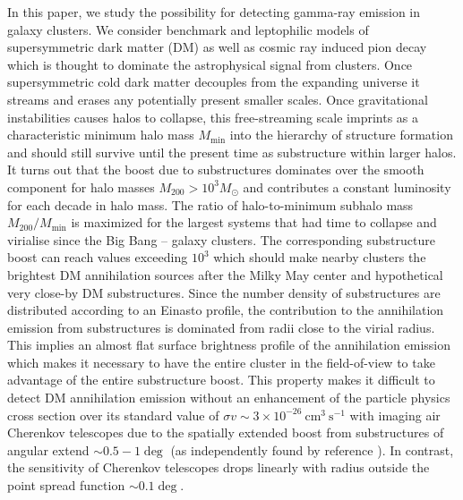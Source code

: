 \documentclass[10pt,aps,pra,reprint,amsmath,amsfonts,amssymb,showpacs,nofootinbib,floatfix]{revtex4-1}
\newcommand{\msun}{M_\odot}
\newcommand{\mvir}{M_{200}}
\begin{document}
In this paper, we study the possibility for detecting gamma-ray
emission in galaxy clusters. We consider benchmark and leptophilic
models of supersymmetric dark matter (DM) as well as cosmic ray
induced pion decay which is thought to dominate the astrophysical
signal from clusters. Once supersymmetric cold dark matter decouples
from the expanding universe it streams and erases any potentially
present smaller scales. Once gravitational instabilities causes halos
to collapse, this free-streaming scale imprints as a characteristic
minimum halo mass $M_\mathrm{min}$ into the hierarchy of structure
formation and should still survive until the present time as
substructure within larger halos. It turns out that the boost due to
substructures dominates over the smooth component for halo masses
$\mvir>10^3 \msun$  and contributes a constant
luminosity for each decade in halo mass. The ratio of halo-to-minimum
subhalo mass $\mvir/M_\mathrm{min}$ is maximized for the largest
systems that had time to collapse and virialise since the Big Bang --
galaxy clusters. The corresponding substructure boost can reach values
exceeding $10^3$ which should make nearby clusters the brightest DM
annihilation sources after the Milky May center and hypothetical very
close-by DM substructures. Since the number density of substructures
are distributed according to an Einasto profile, the contribution to
the annihilation emission from substructures is dominated from radii
close to the virial radius. This implies an almost flat surface
brightness profile of the annihilation emission which makes it
necessary to have the entire cluster in the field-of-view to take
advantage of the entire substructure boost.  This property makes it
difficult to detect DM annihilation emission without an enhancement of
the particle physics cross section over its standard value of $\sigma
v\sim 3\times 10^{-26} ~\mathrm{cm}^3~\mathrm{s}^{-1}$ with imaging
air Cherenkov telescopes due to the spatially extended boost from
substructures of angular extend $\sim 0.5-1\deg$ (as independently
found by reference \cite{2011arXiv1104.3530S}). In contrast, the
sensitivity of Cherenkov telescopes drops linearly with radius outside
the point spread function $\sim0.1\deg$.
\end{document}
